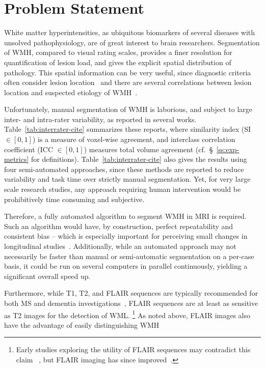 \section{Problem Statement}
White matter hyperintensities,
as ubiquitous biomarkers of several diseases with unsolved pathophysiology,
are of great interest to brain researchers.
Segmentation of WMH, compared to visual rating scales, provides a finer resolution
for quantification of lesion load, and gives the explicit spatial distribution of pathology.
This spatial information can be very useful,
since diagnostic criteria often consider lesion location~\cite{Sorbi2012}
and there are several correlations between lesion location
and suspected etiology of WMH~\cite{Kim2008,Wardlaw2015}.
\par
Unfortunately, manual segmentation of WMH is
laborious, and subject to large inter- and intra-rater variability, as reported in several works.
Table~\ref{tab:interrater-cite} summarizes these reports,
where similarity index (SI $\in [0,1]$) is a measure of voxel-wise agreement,
and interclass correlation coefficient (ICC $\in [0,1]$) measures total volume agreement
(cf.~\S~\ref{ss:exp-metrics} for definitions).
Table~\ref{tab:interrater-cite} also gives the results using four semi-automated approaches,
since these methods are reported to reduce variability and task time
over strictly manual segmentation.
Yet, for very large scale research studies,
any approach requiring human intervention would be prohibitively time consuming and subjective.
\par 
Therefore, a fully automated algorithm to segment WMH in MRI is required.
Such an algorithm would have, by construction,
perfect repeatability and consistent bias -- which is especially important
for perceiving small changes in longitudinal studies~\cite{MSISBI2015}.
Additionally, while an automated approach may not necessarily
be faster than manual or semi-automatic segmentation on a per-case basis,
it could be run on several computers in parallel continuously,
yielding a significant overall speed up.
\par
Furthermore, while T1, T2, and FLAIR sequences are typically recommended
for both MS and dementia investigations~\cite{Simon2006,Wardlaw2013,Traboulsee2015},
FLAIR sequences are at least as sensitive as T2 images for the detection of WML.%
\footnote{Early studies exploring the utility of FLAIR sequences may contradict this claim 
~\cite{Okuda1999,Rovaris2000}, but FLAIR imaging has since improved~\cite{Wardlaw2015}.}
As noted above, FLAIR images also have the advantage of easily distinguishing WMH
